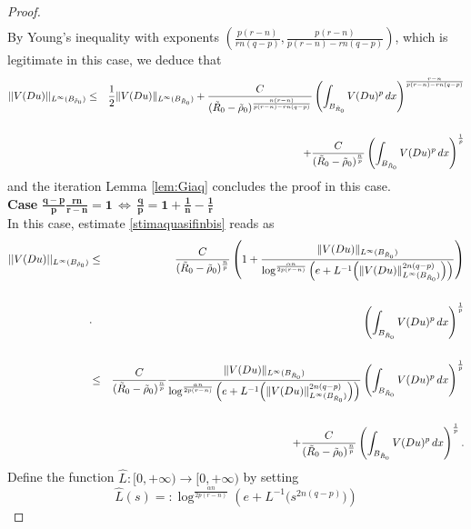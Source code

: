\documentclass[12pt]{amsart}
\theoremstyle{definition}
\numberwithin{equation}{section}
\numberwithin{equation}{section}
\begin{document}
{\begin{proof}
\begin{eqnarray*}
\end{eqnarray*}
By Young's inequality {with exponents $\left(\frac{p(r-n)}{rn(q-p)}, \frac{p(r-n)}{p(r-n)-rn(q-p)}\right)$}, which is legitimate in this case, we deduce that
\begin{eqnarray}\label{stimaquasifinbisbis}
	||V(Du)||_{L^{\infty}(B_{\tilde\rho_0})} &\le& \frac12 \|V(Du)\|_{L^{\infty}(B_{\tilde R_0})}+{\frac{C}{(\tilde R_0-\tilde \rho_0 )^{\frac{n(r-n)}{p(r-n)-rn(q-p)}}}\left(\int_{B_{\tilde R_0}}V(Du)^{p}
\, dx\right)^{\frac{r-n}{p(r-n)-rn(q-p)}}} \cr\cr
    &&+\frac{C }{( \tilde R_0- \tilde \rho_0 )^{\frac{n}{p}}} \left(\int_{B_{\tilde R_0}}V(Du)^{p}
\, dx\right)^{\frac{1}{p}}
\end{eqnarray}
and the iteration Lemma \ref{lem:Giaq} concludes the proof {in this case}.
\\
{\bf Case} $\mathbf{\frac{q-p}{p}\frac{rn}{r-n}=1{\,\Longleftrightarrow\,\frac{q}{p}=1+\frac{1}{n}-\frac{1}{r}}}$ 
\\
In this case, estimate \eqref{stimaquasifinbis} reads as
\begin{eqnarray}\label{stimaquasifinter}
	||V(Du)||_{L^{\infty}(B_{\tilde\rho_0})} &\le& \frac{C}{(\tilde R_0-\tilde \rho_0 )^{\frac{n}{p}}} \left(1+\frac{\|V(Du)\|_{L^{\infty}(B_{\tilde R_0})}}{\log^{{\frac{\alpha n}{2p(r-n)}}}\left(e+L^{-1} \Big(\|V(Du)\|^{2n(q-p)}_{L^{\infty}(B_{\tilde R_0})}\Big)\right)} \right)\cr\cr  
    &\cdot& \left(\int_{B_{\tilde R_0}}V(Du)^{p}
\, dx\right)^{\frac{1}{p}}\cr\cr
&\le& \frac{C}{(\tilde R_0-\tilde \rho_0 )^{\frac{n}{p}}} \frac{\|V(Du)\|_{L^{\infty}(B_{\tilde R_0})}}{\log^{{\frac{\alpha n}{2p(r-n)}}}\left(e+L^{-1} \Big(\|V(Du)\|^{2n(q-p)}_{L^{\infty}(B_{\tilde R_0})}\Big)\right) }\left(\int_{B_{\tilde R_0}}V(Du)^{p}
\, dx\right)^{\frac{1}{p}}  
    \cr\cr
&&\quad+ \frac{C}{(\tilde R_0-\tilde \rho_0 )^{\frac{n}{p}}}  \left(\int_{B_{\tilde R_0}}V(Du)^{p}
\, dx\right)^{\frac{1}{p}}.
\end{eqnarray}
Define the function $\widehat{L}:[0,+\infty)\to [0,+\infty)$ by setting
\begin{equation}\label{defL}
    \widehat{L}(s)=:\log^{{\frac{\alpha n}{2p(r-n)}}}\left(e+L^{-1} \Big(s^{2n(q-p)}\Big)\right)
\end{equation}

\end{proof}}
\end{document}
